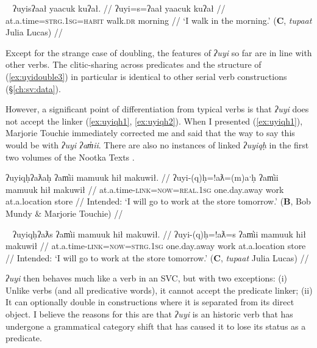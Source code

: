 \ex~ \label{ex:uyidouble3}
\begingl
\glpreamble ʔuyisʔaał yaacuk kuʔał. //
\gla ʔuyi=s=ʔaał yaacuk kuʔał //
\glb at.a.time=\textsc{strg.1sg}=\textsc{habit} walk.\textsc{dr} morning //
\glft `I walk in the morning.' (\textbf{C}, \textit{tupaat} Julia Lucas) //
\endgl
\xe

Except for the strange case of doubling, the features of \textit{ʔuyi} so far are in line with other verbs. The clitic-sharing across predicates and the structure of (\ref{ex:uyidouble3}) in particular is identical to other serial verb constructions (\S\ref{ch:sv:data}).

However, a significant point of differentiation from typical verbs is that \textit{ʔuyi} does not accept the linker (\ref{ex:uyiqh1}, \ref{ex:uyiqh2}). When I presented (\ref{ex:uyiqh1}), Marjorie Touchie immediately corrected me and said that the way to say this would be with \textit{ʔuyi ʔam̓ii}. There are also no instances of linked \textit{ʔuyiqḥ} in the first two volumes of the Nootka Texts \citep{sapir1939, sapir1955}.

\ex \label{ex:uyiqh1}
\begingl
\glpreamble *ʔuyiqḥʔaƛaḥ ʔam̓ii mamuuk hił makuwił. //
\gla ʔuyi-(q)ḥ=!aƛ=(m)aˑḥ ʔam̓ii mamuuk hił makuwił //
\glb at.a.time-\textsc{link}=\textsc{now}=\textsc{real.1sg} one.day.away work at.a.location store //
\glft Intended: `I will go to work at the store tomorrow.' (\textbf{B}, Bob Mundy \& Marjorie Touchie) //
\endgl
\xe

\ex~ \label{ex:uyiqh2}
\begingl
\glpreamble *ʔuyiqḥʔaƛs ʔam̓ii mamuuk hił makuwił. //
\gla ʔuyi-(q)ḥ=!aƛ=s ʔam̓ii mamuuk hił makuwił //
\glb at.a.time-\textsc{link}=\textsc{now}=\textsc{strg.1sg} one.day.away work at.a.location store //
\glft Intended: `I will go to work at the store tomorrow.' (\textbf{C}, \textit{tupaat} Julia Lucas) //
\endgl
\xe

\textit{ʔuyi} then behaves much like a verb in an SVC, but with two exceptions: (i) Unlike verbs (and all predicative words), it cannot accept the predicate linker; (ii) It can optionally double in constructions where it is separated from its direct object. I believe the reasons for this are that \textit{ʔuyi} is an historic verb that has undergone a grammatical category shift that has caused it to lose its status as a predicate.

